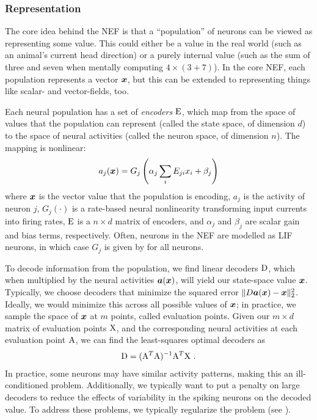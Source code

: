 \subsubsection{Representation}

The core idea behind the NEF is that a ``population'' of neurons
can be viewed as representing some value.
This could either be a value in the real world
(such as an animal's current head direction)
or a purely internal value
(such as the sum of three and seven when mentally computing $4 \times (3 + 7)$).
In the core NEF, each population represents a vector $\boldsymbol{x}$,
but this can be extended to representing things like
scalar- and vector-fields, too.

Each neural population has a set of \emph{encoders} $\mathrm{E}$,
which map from the space of values that the population can represent
(called the state space, of dimension $d$)
to the space of neural activities (called the neuron space, of dimension $n$).
The mapping is nonlinear:
\begin{align}
  a_j(\boldsymbol{x}) = G_j\left(\alpha_j \sum_i E_{ji} x_i + \beta_j\right)
\end{align}
where $\boldsymbol{x}$ is the vector value that the population is encoding,
$a_j$ is the activity of neuron $j$,
$G_j(\cdot)$ is a rate-based neural nonlinearity
transforming input currents into firing rates,
$\mathrm{E}$ is a $n \times d$ matrix of encoders,
and $\alpha_j$ and $\beta_j$ are scalar gain and bias terms, respectively.
Often, neurons in the NEF are modelled as LIF neurons,
in which case $G_j$ is given by  for all neurons.

To decode information from the population,
we find linear decoders $\mathrm{D}$,
which when multiplied by the neural activities $\boldsymbol{a}(\boldsymbol{x})$,
will yield our state-space value $\boldsymbol{x}$.
Typically, we choose decoders that minimize the squared error
$\|D \boldsymbol{a}(\boldsymbol{x}) - \boldsymbol{x}\|_2^2$.
Ideally, we would minimize this across all possible values of $\boldsymbol{x}$;
in practice, we sample the space of $\boldsymbol{x}$ at $m$ points,
called evaluation points.
Given our $m \times d$ matrix of evaluation points $\mathrm{X}$,
and the corresponding neural activities at each evaluation point $\mathrm{A}$,
we can find the least-squares optimal decoders as
\begin{align}
  \mathrm{D} = (\mathrm{A}^T \mathrm{A})^{-1} \mathrm{A}^T \mathrm{X} \text{ .}
\end{align}
In practice, some neurons may have similar activity patterns,
making this an ill-conditioned problem.
Additionally, we typically want to put a penalty on large decoders
to reduce the effects of variability in the spiking neurons on the decoded value.
To address these problems, we typically regularize the problem
(see ).


